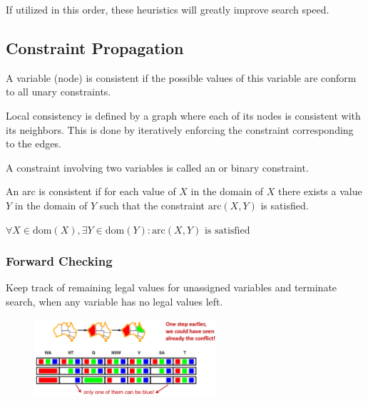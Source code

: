 \documentclass[
../../EiKI_Summary.tex,
]
{subfiles}
\begin{document}
If utilized in this order, these heuristics will greatly improve search speed.

\subsection{Constraint Propagation}
\begin{defbox}
    A variable (node) is consistent if the possible values of this variable are conform to all unary constraints.
\end{defbox}

\begin{defbox}
    Local consistency is defined by a graph where each of its nodes is consistent with its neighbors. This is done by iteratively enforcing the constraint corresponding to the edges.
\end{defbox}

\begin{defbox}
    [Arc]
    A constraint involving two variables is called an  or binary constraint.
\end{defbox}

\begin{defbox}
    An arc is consistent if for each value of $X$ in the domain of $X$ there exists a value $Y$ in the domain of $Y$ such that the constraint $\text{arc}(X, Y)$ is satisfied.

    \begin{csmb*}
        $\forall X \in \text{dom}(X), \exists Y \in \text{dom}(Y): \text{arc}(X, Y) \text{ is satisfied}$
    \end{csmb*}
\end{defbox}

\subsubsection{Forward Checking}
Keep track of remaining legal values for unassigned variables and terminate search, when any variable has no legal values left.

\begin{figure}
    [H]
    \centering
    \includegraphics[width=0.6\textwidth]{Pics/05/ForwardChecking.png}
\end{figure}
\end{document}
